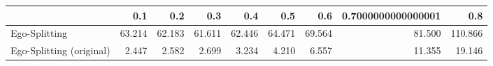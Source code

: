 \begin{tabular}{lrrrrrrrr}
\toprule
{} &    0.1 &    0.2 &    0.3 &    0.4 &    0.5 &    0.6 & 0.7000000000000001 &     0.8 \\
\midrule
Ego-Splitting            & 63.214 & 62.183 & 61.611 & 62.446 & 64.471 & 69.564 &             81.500 & 110.866 \\
Ego-Splitting (original) &  2.447 &  2.582 &  2.699 &  3.234 &  4.210 &  6.557 &             11.355 &  19.146 \\
\bottomrule
\end{tabular}
